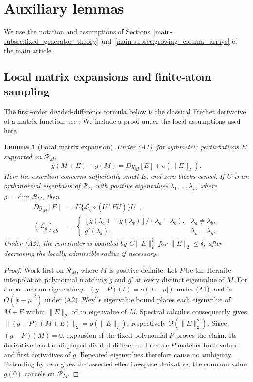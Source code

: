\documentclass[11pt,a4paper,leqno]{article}
\numberwithin{equation}{section}
\numberwithin{figure}{section}
\numberwithin{table}{section}
\theoremstyle{plain}
\newtheorem{lemma}{Lemma}[section]
\theoremstyle{definition}
\theoremstyle{remark}
\begin{document}
\appendix
\section{Auxiliary lemmas}
\label{supp:sec:lemmas}
We use the notation and assumptions of Sections~\ref{main-subsec:fixed_generator_theory}
and~\ref{main-subsec:growing_column_arrays} of the main article.

\subsection{Local matrix expansions and finite-atom sampling}
The first-order divided-difference formula below is the classical
Fr\'echet derivative of a matrix function; see \citet[Chapter~3]{higham2008functions}.
We include a proof under the local assumptions used here.
\begin{lemma}[Local matrix expansion]\label{lem:local_matrix}
Under (A1), for symmetric perturbations $E$ supported on $\mathcal R_M$,
\[
 g(M+E)-g(M)=Dg_M[E]+o(\|E\|_2).
\]
Here the assertion concerns sufficiently small $E$, and zero blocks cancel.
If $U$ is an orthonormal eigenbasis of $\mathcal R_M$ with positive
eigenvalues $\lambda_1,\ldots,\lambda_\rho$, where $\rho=\dim\mathcal R_M$, then
\[
 \begin{aligned}
 Dg_M[E]&=U\{\mathcal L_g\circ(U^\top EU)\}U^\top,\\
 (\mathcal L_g)_{ab}&=
 \begin{cases}
 [g(\lambda_a)-g(\lambda_b)]/(\lambda_a-\lambda_b),
       &\lambda_a\ne\lambda_b,\\
 g'(\lambda_a),&\lambda_a=\lambda_b.
 \end{cases}
 \end{aligned}
\]
Under (A2), the remainder is bounded by $C\|E\|_2^2$ for $\|E\|_2\le\delta$,
after decreasing the locally admissible radius if necessary.
\end{lemma}
\begin{proof}
Work first on $\mathcal R_M$, where $M$ is positive definite.
Let $P$ be the Hermite interpolation polynomial matching $g$ and $g'$
at every distinct eigenvalue of $M$. For $t$ near such an eigenvalue $\mu$,
$(g-P)(t)=o(|t-\mu|)$ under (A1), and is $O(|t-\mu|^2)$ under (A2).
Weyl's eigenvalue bound places each eigenvalue of $M+E$ within $\|E\|_2$
of an eigenvalue of $M$. Spectral calculus consequently gives
$\|(g-P)(M+E)\|_2=o(\|E\|_2)$, respectively $O(\|E\|_2^2)$.
Since $(g-P)(M)=0$, expansion of the fixed polynomial $P$ proves the claim.
Its derivative has the displayed divided differences because $P$ matches
both values and first derivatives of $g$. Repeated eigenvalues therefore
cause no ambiguity. Extending by zero gives the asserted effective-space
derivative; the common value $g(0)$ cancels on $\mathcal R_M^\perp$.
\end{proof}
\end{document}
